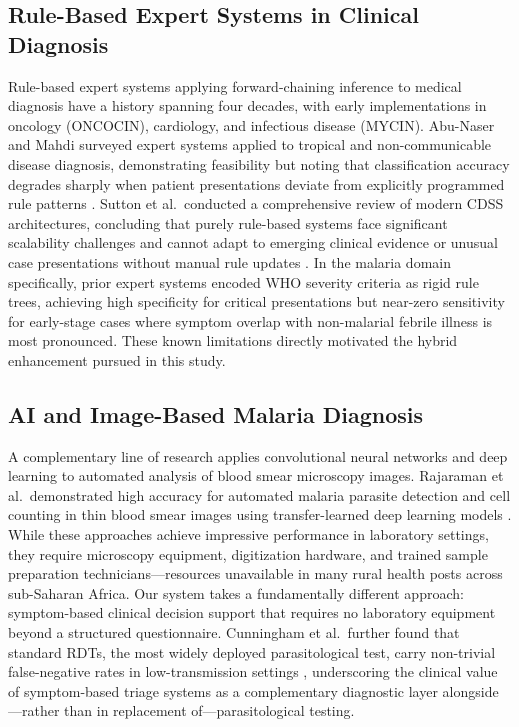 \documentclass[12pt,a4paper]{article}
\begin{document}
\subsection{Rule-Based Expert Systems in Clinical Diagnosis}

Rule-based expert systems applying forward-chaining inference to medical diagnosis have a history spanning four decades, with early implementations in oncology (ONCOCIN), cardiology, and infectious disease (MYCIN). Abu-Naser and Mahdi surveyed expert systems applied to tropical and non-communicable disease diagnosis, demonstrating feasibility but noting that classification accuracy degrades sharply when patient presentations deviate from explicitly programmed rule patterns \cite{ref14}. Sutton et al.\ conducted a comprehensive review of modern CDSS architectures, concluding that purely rule-based systems face significant scalability challenges and cannot adapt to emerging clinical evidence or unusual case presentations without manual rule updates \cite{ref7}. In the malaria domain specifically, prior expert systems encoded WHO severity criteria as rigid rule trees, achieving high specificity for critical presentations but near-zero sensitivity for early-stage cases where symptom overlap with non-malarial febrile illness is most pronounced. These known limitations directly motivated the hybrid enhancement pursued in this study.

\subsection{AI and Image-Based Malaria Diagnosis}

A complementary line of research applies convolutional neural networks and deep learning to automated analysis of blood smear microscopy images. Rajaraman et al.\ demonstrated high accuracy for automated malaria parasite detection and cell counting in thin blood smear images using transfer-learned deep learning models \cite{ref6}. While these approaches achieve impressive performance in laboratory settings, they require microscopy equipment, digitization hardware, and trained sample preparation technicians---resources unavailable in many rural health posts across sub-Saharan Africa. Our system takes a fundamentally different approach: symptom-based clinical decision support that requires no laboratory equipment beyond a structured questionnaire. Cunningham et al.\ further found that standard RDTs, the most widely deployed parasitological test, carry non-trivial false-negative rates in low-transmission settings \cite{ref11}, underscoring the clinical value of symptom-based triage systems as a complementary diagnostic layer alongside---rather than in replacement of---parasitological testing.
\end{document}
